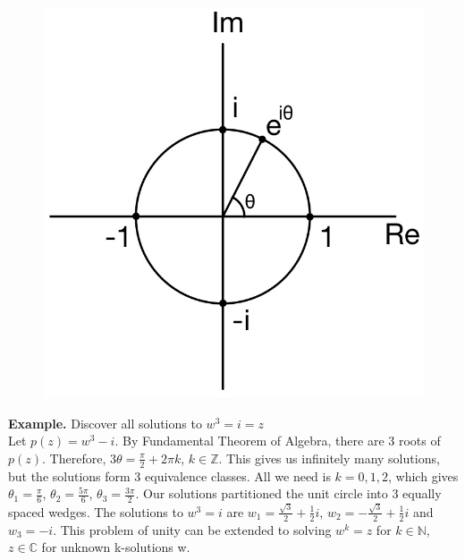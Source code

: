 \documentclass[11pt]{article}
\begin{document}
\begin{figure}[H]
\includegraphics[scale = 0.2]{2_4}
\centering
\end{figure}
\textbf{Example.} Discover all solutions to $w^3 = i = z$ \\
Let $p(z) = w^3 - i$. By Fundamental Theorem of Algebra, there are 3 roots of $p(z)$. Therefore, $3\theta= \frac{\pi}{2} + 2\pi k$, $k \in \mathbb{Z}$. This gives us infinitely many solutions, but the solutions form 3 equivalence classes. All we need is $k = 0, 1, 2$, which gives $\theta_1 = \frac{\pi}{6}$, $\theta_2 = \frac{5\pi}{6}$, $\theta_3 = \frac{3\pi}{2}$. Our solutions partitioned the unit circle into 3 equally spaced wedges. The solutions to $w^3 = i$ are $w_1 = \frac{\sqrt3}{2} + \frac{1}{2}i$, $w_2 = -\frac{\sqrt3}{2} + \frac{1}{2}i$ and $w_3 = -i$. This problem of unity can be extended to solving $w^k = z$ for $k \in \mathbb{N}$, $z \in \mathbb{C}$ for unknown k-solutions w.  
\end{document}

